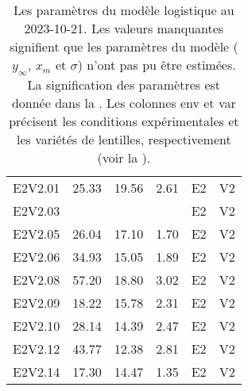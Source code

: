 \begin{table}[ht]
\begin{tabular}{rrrrll}
  E2V2.01 & 25.33 & 19.56 & 2.61 & E2 & V2 \\ 
  E2V2.03 &  &  &  & E2 & V2 \\ 
  E2V2.05 & 26.04 & 17.10 & 1.70 & E2 & V2 \\ 
  E2V2.06 & 34.93 & 15.05 & 1.89 & E2 & V2 \\ 
  E2V2.08 & 57.20 & 18.80 & 3.02 & E2 & V2 \\ 
  E2V2.09 & 18.22 & 15.78 & 2.31 & E2 & V2 \\ 
  E2V2.10 & 28.14 & 14.39 & 2.47 & E2 & V2 \\ 
  E2V2.12 & 43.77 & 12.38 & 2.81 & E2 & V2 \\ 
  E2V2.14 & 17.30 & 14.47 & 1.35 & E2 & V2 \\ 
   \hline
\end{tabular}
\endgroup
\caption{\color{bleu}Les paramètres du modèle logistique au 2023-10-21. Les valeurs manquantes signifient que les paramètres du modèle ($y_\infty$, $x_m$ et $\sigma$) n'ont pas pu être estimées. La signification des paramètres est donnée dans la . Les colonnes env et var précisent les conditions expérimentales et les variétés de lentilles, respectivement (voir la ).} 
\label{tabparam}
\end{table}
